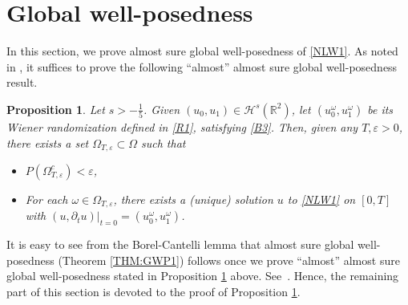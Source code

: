 \documentclass[letterpaper, 11pt,  reqno]{amsart}
\newtheorem{proposition}[theorem]{Proposition}
\newcommand{\1}{\hspace{0.5mm}\text{I}\hspace{0.2mm}}
\newcommand{\R}{\mathbb{R}}
\newcommand{\eps}{\varepsilon}
\newcommand{\dt}{\partial_t}
\renewcommand{\o}{\omega}
\renewcommand{\O}{\Omega}
\renewcommand{\H}{\mathcal{H}}
\numberwithin{equation}{section}
\numberwithin{theorem}{section}
\begin{document}
\section{Global well-posedness}\label{SEC:GWP}

In this section, we prove almost sure global well-posedness of \eqref{NLW1}.
As noted in \cite{CO, BOP2}, 
it suffices to prove the following 
 ``almost'' almost sure global well-posedness result.



\begin{proposition}\label{PROP:aasGWP}
Let $s> -\frac 15$.
Given $(u_0, u_1)  \in \H^s(\R^2)$, let $(u_0^\o, u_1^\o)$ be its Wiener randomization defined in \eqref{R1},
satisfying \eqref{B3}.
Then, given any $T, \eps > 0$, there exists a set $ \O_{T, \eps}\subset \O$
such that
\begin{itemize}
\item[\textup{(i)}]
$P( \O_{T, \eps}^c) < \eps$,

\item[\textup{(ii)}]
For each $\o \in \O_{T, \eps}$, there exists a \textup{(}unique\textup{)} solution $u$
to \eqref{NLW1}  on $[0, T]$
with $(u, \dt u)|_{t = 0} = (u_0^\o, u_1^\o)$.

\end{itemize}

\end{proposition}
	

It is easy to see from the Borel-Cantelli lemma that
almost sure global well-posedness (Theorem \ref{THM:GWP1}) follows
once we prove 
``almost'' almost sure global well-posedness
stated in Proposition \ref{PROP:aasGWP} above.
See~\cite{CO, BOP2}.
Hence, the remaining part of this 
section is devoted to the proof of Proposition \ref{PROP:aasGWP}.
\end{document}
